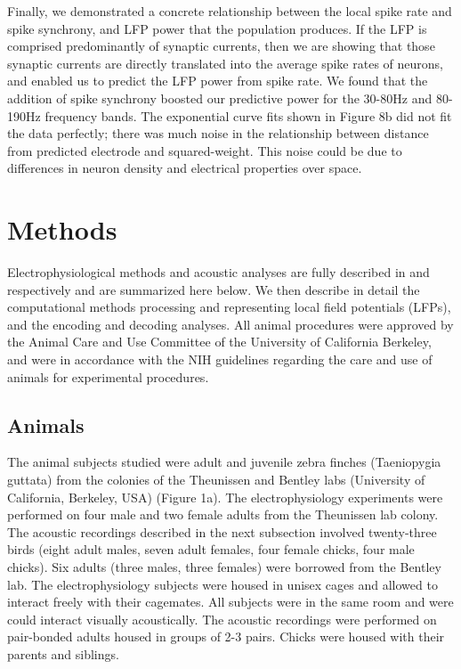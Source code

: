     Finally, we demonstrated a concrete relationship between the local spike rate and spike synchrony, and LFP power that the population produces. If the LFP is comprised predominantly of synaptic currents, then we are showing that those synaptic currents are directly translated into the average spike rates of neurons, and enabled us to predict the LFP power from spike rate. We found that the addition of spike synchrony boosted our predictive power for the 30-80Hz and 80-190Hz frequency bands. The exponential curve fits shown in Figure 8b did not fit the data perfectly; there was much noise in the relationship between distance from predicted electrode and squared-weight. This noise could be due to differences in neuron density and electrical properties over space.


\section{Methods}

Electrophysiological methods and acoustic analyses are fully described in \cite{Elie2015a} and \cite{Elie2015b} respectively and are summarized here below. We then describe in detail the computational methods processing and representing local field potentials (LFPs), and the encoding and decoding analyses. All animal procedures were approved by the Animal Care and Use Committee of the University of California Berkeley, and were in accordance with the NIH guidelines regarding the care and use of animals for experimental procedures.

\subsection{Animals}

The animal subjects studied were adult and juvenile zebra finches (Taeniopygia guttata) from the colonies of the Theunissen and Bentley labs (University of California, Berkeley, USA) (Figure 1a). The electrophysiology experiments were performed on four male and two female adults from the Theunissen lab colony. The acoustic recordings described in the next subsection involved twenty-three birds (eight adult males, seven adult females, four female chicks, four male chicks). Six adults (three males, three females) were borrowed from the Bentley lab.
The electrophysiology subjects were housed in unisex cages and allowed to interact freely with their cagemates. All subjects were in the same room and were could interact visually acoustically. The acoustic recordings were performed on pair-bonded adults housed in groups of 2-3 pairs. Chicks were housed with their parents and siblings.


